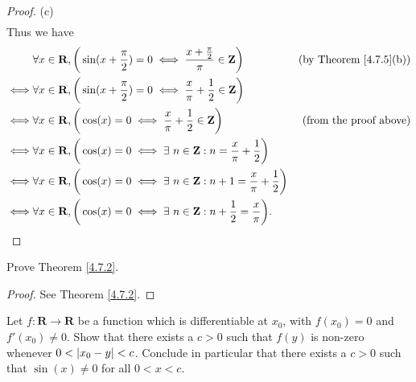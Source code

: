 \begin{proof}{(c)}
\begin{align*}
    \end{align*}
    Thus we have
    \begin{align*}
             & \forall x \in \mathbf{R}, \bigg(\sin(x + \frac{\pi}{2}) = 0 \iff \frac{x + \frac{\pi}{2}}{\pi} \in \mathbf{Z}\bigg)    & \text{(by Theorem \ref{4.7.5}(b))} \\
        \iff & \forall x \in \mathbf{R}, \bigg(\sin(x + \frac{\pi}{2}) = 0 \iff \frac{x}{\pi} + \frac{1}{2} \in \mathbf{Z}\bigg)                                           \\
        \iff & \forall x \in \mathbf{R}, \bigg(\cos(x) = 0 \iff \frac{x}{\pi} + \frac{1}{2} \in \mathbf{Z}\bigg)                      & \text{(from the proof above)}      \\
        \iff & \forall x \in \mathbf{R}, \bigg(\cos(x) = 0 \iff \exists\ n \in \mathbf{Z} : n = \frac{x}{\pi} + \frac{1}{2}\bigg)                                          \\
        \iff & \forall x \in \mathbf{R}, \bigg(\cos(x) = 0 \iff \exists\ n \in \mathbf{Z} : n + 1 = \frac{x}{\pi} + \frac{1}{2}\bigg)                                      \\
        \iff & \forall x \in \mathbf{R}, \bigg(\cos(x) = 0 \iff \exists\ n \in \mathbf{Z} : n + \frac{1}{2} = \frac{x}{\pi}\bigg).
    \end{align*}
\end{proof}

\exercisesection

\begin{exercise}\label{ex 4.7.1}
    Prove Theorem \ref{4.7.2}.
\end{exercise}

\begin{proof}
    See Theorem \ref{4.7.2}.
\end{proof}

\begin{exercise}\label{ex 4.7.2}
    Let \(f : \mathbf{R} \to \mathbf{R}\) be a function which is differentiable at \(x_0\), with \(f(x_0) = 0\) and \(f'(x_0) \neq 0\).
    Show that there exists a \(c > 0\) such that \(f(y)\) is non-zero whenever \(0 < \abs*{x_0 - y} < c\).
    Conclude in particular that there exists a \(c > 0\) such that \(\sin(x) \neq 0\) for all \(0 < x < c\).
\end{exercise}

